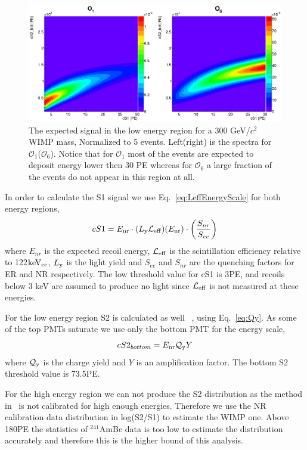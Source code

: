 \begin{figure}[h!]
\begin{minipage}{1.\linewidth}
\centerline{\includegraphics[width=1.\linewidth]{Figures/SigLowO1O6.eps}}
\end{minipage}
\caption{The expected signal in the low energy region for a 300 GeV/$c^2$ WIMP mass, Normalized to 5 events. Left(right) is the spectra for $\mathcal{O}_1$($\mathcal{O}_6$). Notice that for $\mathcal{O}_1$ most of the events are expected to deposit energy lower then 30 PE whereas for $\mathcal{O}_6$ a large fraction of the events do not appear in this region at all.}
\label{fig:LowE}
\end{figure}

In order to calculate the S1 signal we use Eq.~\ref{eq:LeffEnergyScale} for both energy regions, 
\begin{equation}
\label{eq:LeffEnergyScale}
	cS1 = E_{\mathrm{nr}} \cdot (L_{\mathrm{y}} \mathcal{L}_{\mathrm{eff}})(E_{\mathrm{nr}})\cdot   \left(\frac{S_{nr}}{S_{ee}}\right) 
\end{equation}
where $E_{nr}$ is the expected recoil energy, $\mathcal{L}_{\mathrm{eff}}$ is the scintillation efficiency relative to 122$\mathrm{keV_{ee}}$, $L_{\mathrm{y}}$ is the light yield and $S_{ee}$ and $S_{nr}$ are the quenching factors for ER and NR respectively. The low threshold value for cS1 is 3PE, and recoils below 3 keV are assumed to produce no light since $\mathcal{L}_{\mathrm{eff}}$ is not measured at these energies. 

For the low energy region S2 is calculated as well ~\cite{DataMCXenon}, using Eq.~\ref{eq:Qy}. As some of the top PMTs saturate we use only the bottom PMT for the energy scale, 
\begin{equation}
\label{eq:Qy}
	cS2_{bottom} = E_{\mathrm{nr}}\mathcal{Q}_{\mathrm{y}} Y   
\end{equation}  
where $\mathcal{Q}_{\mathrm{y}}$ is the charge yield and $Y$ is an amplification factor. The bottom S2 threshold value is 73.5PE.

For the high energy region we can not produce the S2 distribution as the method in~\cite{DataMCXenon} is not calibrated for high enough energies. Therefore we use the NR calibration data distribution in log(S2/S1) to estimate the WIMP one. Above 180PE the statistics of $^{241}$AmBe data is too low to estimate the distribution accurately and therefore this is the higher bound of this analysis.   


